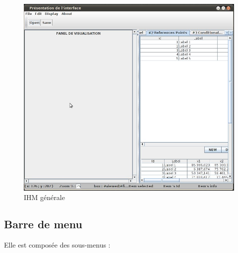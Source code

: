 \documentclass[a4paper]{article}
\begin{document}
\begin{figure}[h]
  \center
  \includegraphics[scale=0.40]{spec-images/ihm_generale.jpeg}
  \caption{IHM générale}
\end{figure}

\subsection{Barre de menu}
Elle est composée des sous-menus :
\end{document}
